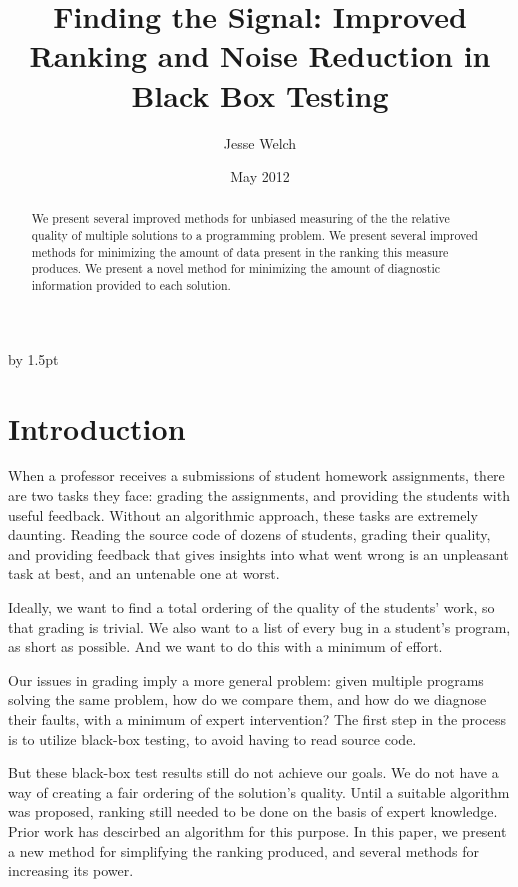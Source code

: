 \documentclass[11pt,twoside]{article}
\theoremstyle{definition}
\begin{document}
\advance\extrarowheight by 1.5pt

\title{Finding the Signal: Improved Ranking and Noise Reduction in Black Box Testing}
\author{Jesse Welch}
\date{May 2012}

\pagestyle{headings}


\maketitle

\begin{abstract}
We present several improved methods for unbiased measuring of the the relative quality of multiple solutions to a programming problem. We present several improved methods for minimizing the amount of data present in the ranking this measure produces. We present a novel method for minimizing the amount of diagnostic information provided to each solution.
\end{abstract}

\newpage
\tableofcontents
\newpage

\baselineskip %


\section{Introduction}
When a professor receives a submissions of student homework assignments, there are two tasks they face: grading the assignments, and providing the students with useful feedback. Without an algorithmic approach, these tasks are extremely daunting. Reading the source code of dozens of students, grading their quality, and providing feedback that gives insights into what went wrong is an unpleasant task at best, and an untenable one at worst.

Ideally, we want to find a total ordering of the quality of the students' work, so that grading is trivial. We also want to a list of every bug in a student's program, as short as possible. And we want to do this with a minimum of effort.

Our issues in grading imply a more general problem: given multiple programs solving the same problem, how do we compare them, and how do we diagnose their faults, with a minimum of expert intervention? The first step in the process is to utilize black-box testing, to avoid having to read source code.

But these black-box test results still do not achieve our goals. We do not have a way of creating a fair ordering of the solution's quality. Until a suitable algorithm was proposed, ranking still needed to be done on the basis of expert knowledge. Prior work has descirbed an algorithm for this purpose. In this paper, we present a new method for simplifying the ranking produced, and several methods for increasing its power.
\end{document}
